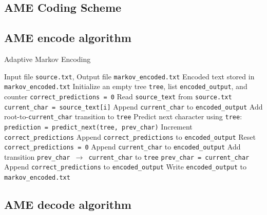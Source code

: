 \documentclass[12pt,twoside]{article}
\begin{document}
\newpage
\appendix

\begin{appendices}

\section{AME Coding Scheme}
\subsection{AME encode algorithm}
\label{app:AMEalgo1}

\begin{algorithm}
    \caption{Adaptive Markov Encoding}
    \label{alg:markov_encode}
    \begin{algorithmic}[1]
    \REQUIRE Input file \texttt{source.txt}, Output file \texttt{markov\_encoded.txt}
    \ENSURE Encoded text stored in \texttt{markov\_encoded.txt}
    \STATE Initialize an empty tree \texttt{tree}, list \texttt{encoded\_output}, and counter \texttt{correct\_predictions = 0}
    \STATE Read \texttt{source\_text} from \texttt{source.txt}
        \STATE \texttt{current\_char = source\_text[i]}
            \STATE Append \texttt{current\_char} to \texttt{encoded\_output}
            \STATE Add root-to-\texttt{current\_char} transition to \texttt{tree}
        \ELSE
            \STATE Predict next character using \texttt{tree}: \texttt{prediction = predict\_next(tree, prev\_char)}
                \STATE Increment \texttt{correct\_predictions}
            \ELSE
                    \STATE Append \texttt{correct\_predictions} to \texttt{encoded\_output}
                    \STATE Reset \texttt{correct\_predictions = 0}
                \ENDIF
                \STATE Append \texttt{current\_char} to \texttt{encoded\_output}
            \ENDIF
            \STATE Add transition \texttt{prev\_char $\to$ current\_char} to \texttt{tree}
        \ENDIF
        \STATE \texttt{prev\_char = current\_char}
    \ENDFOR
        \STATE Append \texttt{correct\_predictions} to \texttt{encoded\_output}
    \ENDIF
    \STATE Write \texttt{encoded\_output} to \texttt{markov\_encoded.txt}
    \end{algorithmic}
\end{algorithm}
\newpage
\subsection{AME decode algorithm}
\label{app:AMEalgo2}


\end{appendices}
\end{document}
